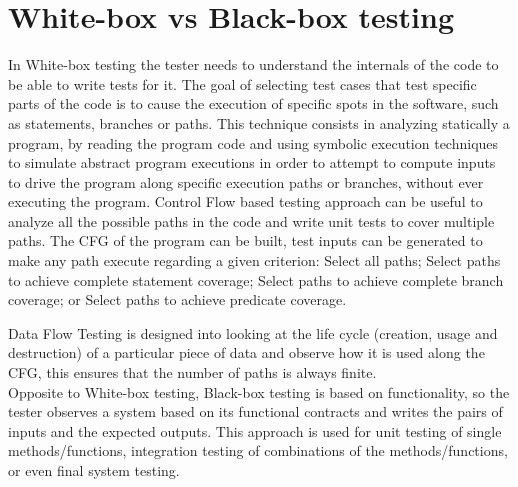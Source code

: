 \section{White-box vs Black-box testing}
In White-box testing the tester needs to understand the internals of
the code to be able to write tests for it.
The goal of selecting test cases that test specific parts of the code
is to cause the execution of specific spots in the software, such as
statements, branches or
paths.
This technique consists in analyzing statically a program, by reading
the program code and using symbolic execution techniques to simulate
abstract program
executions in order to attempt to compute inputs to drive the program
along specific execution paths or branches, without ever executing the
program. Control Flow based testing approach can be useful to analyze all the
possible paths in the code and write unit tests to cover multiple paths.
The \ac{CFG} of the program can be built,
test inputs can be generated to make any path execute regarding a given criterion:
Select all paths;
Select paths to achieve complete statement
coverage\cite{stt,Ntafos:1988:CST:630792.631017};
Select paths to achieve complete branch coverage\cite{Roper1994,stt};
or Select paths to achieve predicate
coverage\cite{stt,Ntafos:1988:CST:630792.631017}.

Data Flow Testing is designed into looking at the life cycle
(creation, usage and destruction) of a particular
piece of data and observe how it is used along the \ac{CFG}, this ensures
that the number of paths is always finite\cite{dataflow}.\\

Opposite to White-box testing, Black-box testing is based on
functionality, so the tester observes a system based
on its functional contracts and writes the pairs of inputs and the
expected outputs.
This approach is used for unit testing of single methods/functions,
integration testing
of combinations of the methods/functions, or even final system testing.\\


